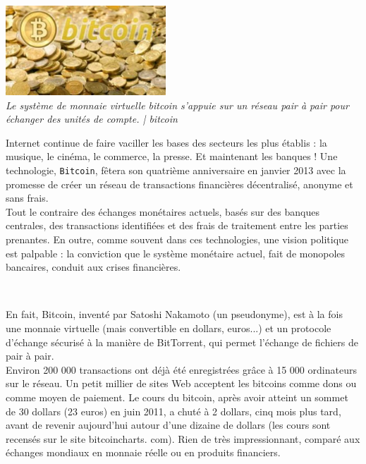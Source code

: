 \documentclass[11pt,twoside,a4paper]{article}
\begin{document}
\begin{minipage}[ht]{6.25cm}	
	\includegraphics[width=6.00cm]{img/1798142_5_9dc4_le-systeme-de-monnaie-virtuelle-bitcoin_9f6a91df917eb587cc1841d336dfc7a5.jpg} ~\\
	\emph{Le syst{\`e}me de monnaie virtuelle bitcoin s'appuie sur un r{\'e}seau pair {\`a} pair pour {\'e}changer des unit{\'e}s de compte. | bitcoin}~\\
\end{minipage} \hfill \begin{minipage}[ht]{12.50cm}
	Internet continue de faire vaciller les bases des secteurs les plus {\'e}tablis : la musique, le cin{\'e}ma, le commerce, la presse. Et maintenant les banques ! Une technologie, \texttt{Bitcoin\footnotemark}, f{\^e}tera son quatri{\`e}me anniversaire en janvier 2013 avec la promesse de cr{\'e}er un r{\'e}seau de transactions financi{\`e}res d{\'e}centralis{\'e}, anonyme et sans frais. ~\\
	
	Tout le contraire des {\'e}changes mon{\'e}taires actuels, bas{\'e}s sur des banques centrales, des transactions identifi{\'e}es et des frais de traitement entre les parties prenantes. En outre, comme souvent dans ces technologies, une vision politique est palpable : la conviction que le syst{\`e}me mon{\'e}taire actuel, fait de monopoles bancaires, conduit aux crises financi{\`e}res. ~\\
\end{minipage}~\\

En fait, Bitcoin, invent{\'e} par Satoshi Nakamoto (un pseudonyme), est {\`a} la fois une monnaie virtuelle (mais convertible en dollars, euros...) et un protocole d'{\'e}change s{\'e}curis{\'e} {\`a} la mani{\`e}re de BitTorrent, qui permet l'{\'e}change de fichiers de pair {\`a} pair. ~\\

Environ 200 000 transactions ont d{\'e}j{\`a} {\'e}t{\'e} enregistr{\'e}es gr{\^a}ce {\`a} 15 000 ordinateurs sur le r{\'e}seau. Un petit millier de sites Web acceptent les bitcoins comme dons ou comme moyen de paiement. Le cours du bitcoin, apr{\`e}s avoir atteint un sommet de 30 dollars (23 euros) en juin 2011, a chut{\'e} {\`a} 2 dollars, cinq mois plus tard, avant de revenir aujourd'hui autour d'une dizaine de dollars (les cours sont recens{\'e}s sur le site bitcoincharts. com). Rien de tr{\`e}s impressionnant, compar{\'e} aux {\'e}changes mondiaux en monnaie r{\'e}elle ou en produits financiers. ~\\
\end{document}
